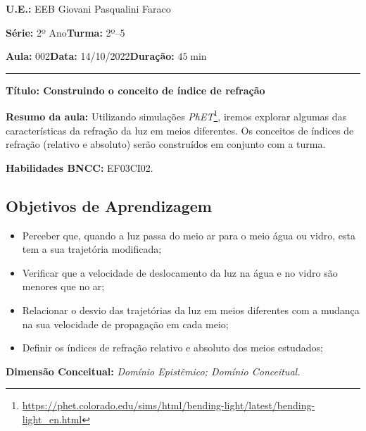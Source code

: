         \noindent \textbf{U.E.:} EEB Giovani Pasqualini Faraco
        
        \noindent \textbf{Série:} 2º Ano\hfill{}\textbf{Turma:} 2º--5
        
        \noindent \textbf{Aula:} 002\hfill{}\textbf{Data:} 14/10/2022\hfill{}\textbf{Duração:} $45\min$
        \rule{\textwidth}{.5pt}
        \bigskip{}  
        
        \noindent \begin{center}
        \textbf{Título: Construindo o conceito de índice de refração}
        \par\end{center}

        \noindent \textbf{Resumo da aula:} Utilizando simulações \emph{PhET}\footnote{\url{https://phet.colorado.edu/sims/html/bending-light/latest/bending-light_en.html}}, iremos explorar algumas das características da refração da luz em meios diferentes. Os conceitos de índices de refração (relativo e absoluto) serão construídos em conjunto com a turma.

        \par\noindent \textbf{Habilidades BNCC:} EF03CI02.
        \vfill
        \subsection*{Objetivos de Aprendizagem}
        \begin{itemize}
            \item Perceber que, quando a luz passa do meio ar para o meio água ou vidro, esta tem a sua trajetória modificada;
            \item Verificar que a velocidade de deslocamento da luz na água e no vidro são menores que no ar;
            \item Relacionar o desvio das trajetórias da luz em meios diferentes com a mudança na sua velocidade de propagação em cada meio;
            \item Definir os índices de refração relativo e absoluto dos meios estudados;
        \end{itemize}
        
        \medskip{}
        \vfill
        \noindent \textbf{Dimensão Conceitual:} \emph{Domínio Epistêmico; Domínio Conceitual.}
        
